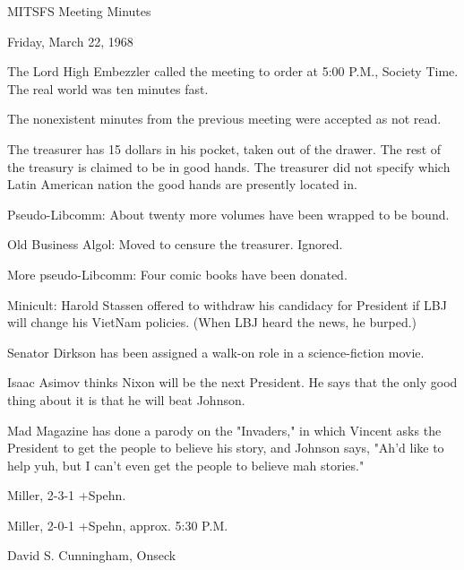\documentclass[12pt]{article}
\begin{document}
\begin{center}

MITSFS Meeting Minutes

Friday, March 22, 1968

\end{center}
 
\vspace{12pt}

\setlength{\parskip}{6pt}

\noindent
The Lord High Embezzler called the meeting to order at
5:00 P.M., Society Time. The real world was ten minutes fast.

The nonexistent minutes from the previous meeting were accepted as not read.

The treasurer has 15 dollars in his pocket, taken out of the drawer. The rest of the treasury is claimed to be in good hands. The treasurer did not specify which Latin American nation the good hands are presently located in.

Pseudo-Libcomm: About twenty more volumes have been wrapped to be bound.

Old Business Algol: Moved to censure the treasurer. Ignored.

More pseudo-Libcomm: Four comic books have been donated.

Minicult: Harold Stassen offered to withdraw his candidacy for President if LBJ will change his VietNam policies. (When LBJ heard the news, he burped.)

Senator Dirkson has been assigned a walk-on role in a science-fiction movie.

Isaac Asimov thinks Nixon will be the next President. He says that the only good thing about it is that he will beat Johnson.

Mad Magazine has done a parody on the "Invaders," in which Vincent asks the President to get the people to believe his story, and Johnson says, "Ah'd like to help yuh, but I can't even get the people to believe mah stories."

Miller, 2-3-1 +Spehn.

Miller, 2-0-1 +Spehn, approx. 5:30 P.M.

\vspace{12pt}

\centerline{David S. Cunningham, Onseck}
\end{document}
